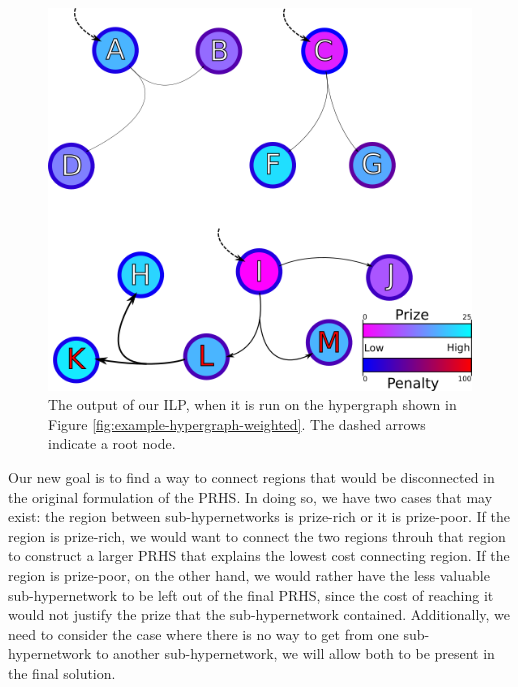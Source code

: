 \documentclass[12pt,twoside]{reedthesis}
\theoremstyle{definition}
\begin{document}
\begin{figure}[hp]
  \begin{center}
    \includegraphics[width=\textwidth/2]{example-hypergraph-weighted-after-ILP}
  \caption[Output from ILP with disconnected sub-hypergraphs]{The output of our ILP, when it is run on the hypergraph shown in Figure \ref{fig:example-hypergraph-weighted}. The dashed arrows indicate a root node.}
  \label{fig:example-hypergraph-weighted-after-ILP}
  \end{center}
\end{figure}

Our new goal is to find a way to connect regions that would be disconnected in the original formulation of the PRHS. In doing so, we have two cases that may exist: the region between sub-hypernetworks is prize-rich or it is prize-poor. If the region is prize-rich, we would want to connect the two regions throuh that region to construct a larger PRHS that explains the lowest cost connecting region. If the region is prize-poor, on the other hand, we would rather have the less valuable sub-hypernetwork to be left out of the final PRHS, since the cost of reaching it would not justify the prize that the sub-hypernetwork contained. Additionally, we need to consider the case where there is no way to get from one sub-hypernetwork to another sub-hypernetwork, we will allow both to be present in the final solution.\par
\end{document}
